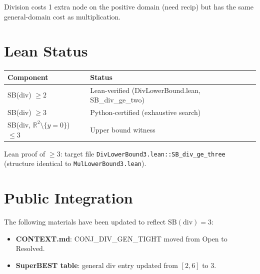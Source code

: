 \documentclass[12pt]{article}
\begin{document}
Division costs 1 extra node on the positive domain (need recip) but has the same
general-domain cost as multiplication.

\section{Lean Status}

\begin{center}
\begin{tabular}{ll}
\toprule
Component & Status \\
\midrule
SB(div) $\geq 2$ & Lean-verified (DivLowerBound.lean, SB\_div\_ge\_two) \\
SB(div) $\geq 3$ & Python-certified (exhaustive search) \\
SB(div, $\mathbb{R}^2 \setminus \{y=0\}$) $\leq 3$ & Upper bound witness \\
\bottomrule
\end{tabular}
\end{center}

Lean proof of $\geq 3$: target file \texttt{DivLowerBound3.lean::SB\_div\_ge\_three}
(structure identical to \texttt{MulLowerBound3.lean}).

\section{Public Integration}

The following materials have been updated to reflect $\mathrm{SB}(\mathrm{div}) = 3$:
\begin{itemize}
  \item \textbf{CONTEXT.md}: CONJ\_DIV\_GEN\_TIGHT moved from Open to Resolved.
  \item \textbf{SuperBEST table}: general div entry updated from $[2,6]$ to $3$.
\end{itemize}
\end{document}
